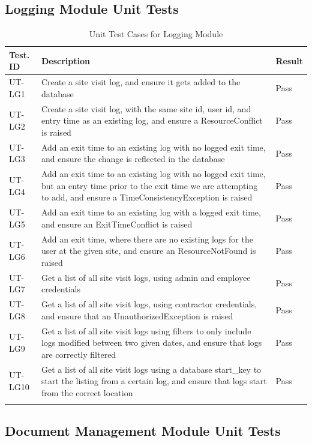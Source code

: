 \documentclass[12pt, titlepage]{article}
\begin{document}
\subsection{Logging Module Unit Tests}

\begin{longtable}{|m{2cm}|m{10cm}|m{1.4cm}|}
  \hline
  \textbf{Test. ID} & \textbf{Description} & \textbf{Result} \\ \hline
  UT-LG1 & Create a site visit log, and ensure it gets added to the
  database & Pass\\ \hline
  UT-LG2 & Create a site visit log, with the same site id, user id,
  and entry time as an existing log, and ensure a ResourceConflict is
  raised & Pass\\ \hline
  UT-LG3 & Add an exit time to an existing log with no logged exit
  time, and ensure the change is reflected in the database & Pass\\ \hline
  UT-LG4 & Add an exit time to an existing log with no logged exit
  time, but an entry time prior to the exit time we are attempting to
  add, and ensure a TimeConsistencyException is raised & Pass\\ \hline
  UT-LG5 & Add an exit time to an existing log with a logged exit
  time, and ensure an ExitTimeConflict is raised & Pass\\ \hline
  UT-LG6 & Add an exit time, where there are no existing logs for
  the user at the given site, and ensure an ResourceNotFound is
  raised & Pass\\ \hline
  UT-LG7 & Get a list of all site visit logs, using admin and
  employee credentials & Pass\\ \hline
  UT-LG8 & Get a list of all site visit logs, using contractor
  credentials, and ensure that an UnauthorizedException is raised &
  Pass\\ \hline
  UT-LG9 & Get a list of all site visit logs using filters to only
  include logs modified between two given dates, and ensure that logs
  are correctly filtered & Pass\\ \hline
  UT-LG10 & Get a list of all site visit logs using a database
  start\_key to start the listing from a certain log, and ensure that
  logs start from the correct location & Pass\\ \hline
  \caption{Unit Test Cases for Logging Module}
\end{longtable}

\subsection{Document Management Module Unit Tests}
\end{document}
